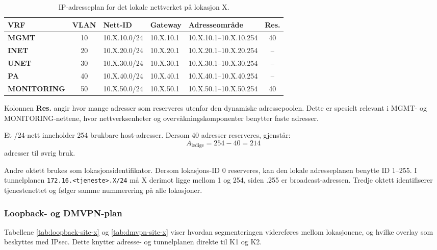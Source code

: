 \begin{table}[H]
    \centering
    \caption{IP-adresseplan for det lokale nettverket på lokasjon X.}
    \label{tab:ipplan-site-x}
    \small
    \renewcommand{\arraystretch}{1.3}
    \setlength{\tabcolsep}{4pt}
    \begin{tabular}{
        >{\bfseries}l
        c
        l
        l
        l
        c
    }
        \toprule
        \rowcolor{tablegreen}
        \color{white}\textbf{VRF} &
        \color{white}\textbf{VLAN} &
        \color{white}\textbf{Nett-ID} &
        \color{white}\textbf{Gateway} &
        \color{white}\textbf{Adresseområde} &
        \color{white}\textbf{Res.} \\
        \midrule
        MGMT       & 10 & 10.X.10.0/24 & 10.X.10.1 & 10.X.10.1--10.X.10.254 & 40 \\
        INET       & 20 & 10.X.20.0/24 & 10.X.20.1 & 10.X.20.1--10.X.20.254 & -- \\
        UNET       & 30 & 10.X.30.0/24 & 10.X.30.1 & 10.X.30.1--10.X.30.254 & -- \\
        PA         & 40 & 10.X.40.0/24 & 10.X.40.1 & 10.X.40.1--10.X.40.254 & -- \\
        MONITORING & 50 & 10.X.50.0/24 & 10.X.50.1 & 10.X.50.1--10.X.50.254 & 40 \\
        \bottomrule
    \end{tabular}
\end{table}
\noindent
Kolonnen \textbf{Res.} angir hvor mange adresser som reserveres utenfor den dynamiske adressepoolen. Dette er spesielt relevant i MGMT- og MONITORING-nettene, hvor nettverksenheter og overvåkningskomponenter benytter faste adresser.

Et /24-nett inneholder 254 brukbare host-adresser. Dersom 40 adresser reserveres, gjenstår:
\[
    A_{\text{ledige}} = 254 - 40 = 214
\]
adresser til øvrig bruk.

Andre oktett brukes som lokasjonsidentifikator. Dersom lokasjons-ID 0 reserveres, kan den lokale adresseplanen benytte ID 1--255. I tunnelplanen \texttt{172.16.<tjeneste>.X/24} må X derimot ligge mellom 1 og 254, siden .255 er broadcast-adressen. Tredje oktett identifiserer tjenestenettet og følger samme nummerering på alle lokasjoner.

\subsubsection{Loopback- og DMVPN-plan}
Tabellene \ref{tab:loopback-site-x} og \ref{tab:dmvpn-site-x} viser hvordan segmenteringen videreføres mellom lokasjonene, og hvilke overlay som beskyttes med IPsec. Dette knytter adresse- og tunnelplanen direkte til K1 og K2.


